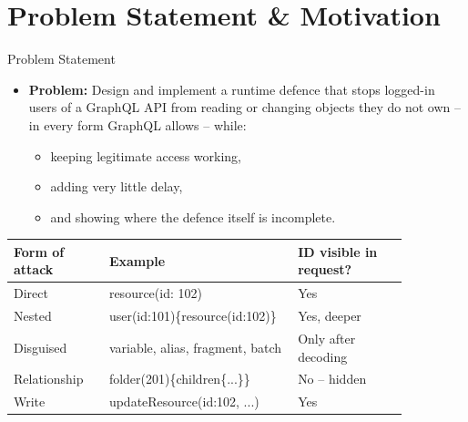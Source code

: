 \documentclass[aspectratio=169,11pt]{beamer}
\begin{document}
\section{Problem Statement \& Motivation}
\begin{frame}{Problem Statement}
\begin{itemize}
\item \textbf{Problem:} Design and implement a runtime defence that stops logged-in users of a GraphQL API from reading or changing objects they do not own – in every form GraphQL allows – while:
\begin{itemize}
\item keeping legitimate access working,
\item adding very little delay,
\item and showing where the defence itself is incomplete.
\end{itemize}
\end{itemize}
\begin{center}
\small
\renewcommand{\arraystretch}{1.12}
\begin{tabular}{>{\raggedright\arraybackslash}p{0.205\linewidth}>{\raggedright\arraybackslash}p{0.410\linewidth}>{\raggedright\arraybackslash}p{0.246\linewidth}}
\toprule
\textbf{Form of attack} & \textbf{Example} & \textbf{ID visible in request?} \\
\midrule
Direct & resource(id: 102) & Yes \\
\rowcolor{rowgrey}Nested & user(id:101)\{resource(id:102)\} & Yes, deeper \\
Disguised & variable, alias, fragment, batch & Only after decoding \\
\rowcolor{rowgrey}Relationship & folder(201)\{children\{...\}\} & No – hidden \\
Write & updateResource(id:102, ...) & Yes \\
\bottomrule
\end{tabular}
\end{center}
\end{frame}
\end{document}
